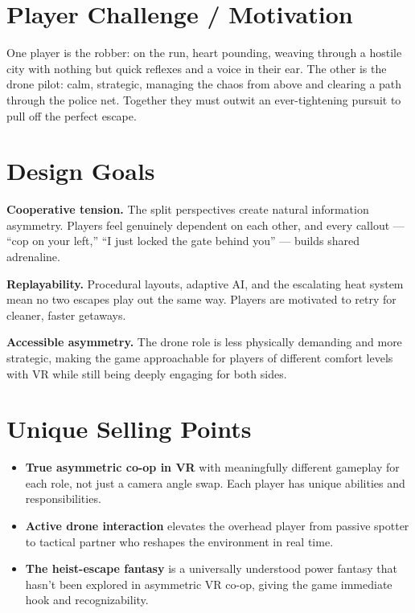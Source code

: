 \documentclass[12pt]{article}
\begin{document}
\section{Player Challenge / Motivation}

One player is the robber: on the run, heart pounding, weaving through a hostile city with nothing but quick reflexes and a voice in their ear. The other is the drone pilot: calm, strategic, managing the chaos from above and clearing a path through the police net. Together they must outwit an ever-tightening pursuit to pull off the perfect escape.

\section{Design Goals}

\textbf{Cooperative tension.} The split perspectives create natural information asymmetry. Players feel genuinely dependent on each other, and every callout --- ``cop on your left,'' ``I just locked the gate behind you'' --- builds shared adrenaline.

\textbf{Replayability.} Procedural layouts, adaptive AI, and the escalating heat system mean no two escapes play out the same way. Players are motivated to retry for cleaner, faster getaways.

\textbf{Accessible asymmetry.} The drone role is less physically demanding and more strategic, making the game approachable for players of different comfort levels with VR while still being deeply engaging for both sides.

\section{Unique Selling Points}

\begin{itemize}[leftmargin=2em]
    \item \textbf{True asymmetric co-op in VR} with meaningfully different gameplay for each role, not just a camera angle swap. Each player has unique abilities and responsibilities.
    \item \textbf{Active drone interaction} elevates the overhead player from passive spotter to tactical partner who reshapes the environment in real time.
    \item \textbf{The heist-escape fantasy} is a universally understood power fantasy that hasn't been explored in asymmetric VR co-op, giving the game immediate hook and recognizability.
\end{itemize}
\end{document}
